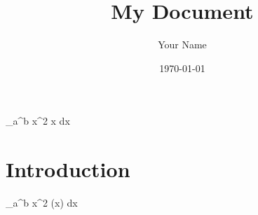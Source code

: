 \documentclass{article}
\title{My Document}
\author{Your Name}
\date{\today}
\begin{document}
\maketitle
\int_a^b x^2 \cos x dx

\section{Introduction}
\int_a^b x^2  \cos(x)  dx
\end{document}
